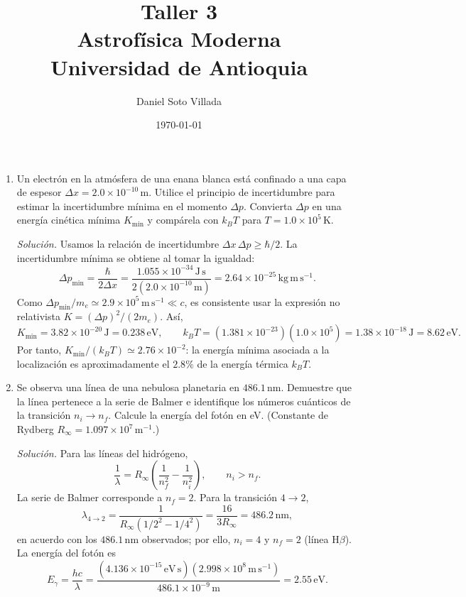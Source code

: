 \documentclass[11pt]{article}
\title{Taller 3\\[0.5em]
\large Astrofísica Moderna\\
Universidad de Antioquia}
\author{Daniel Soto Villada}
\date{\today}
\begin{document}
\maketitle

\begin{enumerate}
    \item Un electrón en la atmósfera de una enana blanca está confinado a una capa de espesor $\Delta x = 2.0 \times 10^{-10}\,\mathrm{m}$. Utilice el principio de incertidumbre para estimar la incertidumbre mínima en el momento $\Delta p$. Convierta $\Delta p$ en una energía cinética mínima $K_{\min}$ y compárela con $k_B T$ para $T = 1.0 \times 10^5\,\mathrm{K}$.

    \textit{Solución.} Usamos la relación de incertidumbre $\Delta x\,\Delta p\geq\hbar/2$. La incertidumbre mínima se obtiene al tomar la igualdad:
    \[
        \Delta p_{\min}=\frac{\hbar}{2\Delta x}
        =\frac{1.055\times10^{-34}\,\mathrm{J\,s}}
        {2(2.0\times10^{-10}\,\mathrm{m})}
        =2.64\times10^{-25}\,\mathrm{kg\,m\,s^{-1}}.
    \]
    Como $\Delta p_{\min}/m_e\simeq2.9\times10^5\,\mathrm{m\,s^{-1}}\ll c$, es consistente usar la expresión no relativista $K=(\Delta p)^2/(2m_e)$. Así,
    \[
        K_{\min}=3.82\times10^{-20}\,\mathrm{J}=0.238\,\mathrm{eV},
        \qquad k_BT=(1.381\times10^{-23})(1.0\times10^5)
        =1.38\times10^{-18}\,\mathrm{J}=8.62\,\mathrm{eV}.
    \]
    Por tanto, $K_{\min}/(k_BT)\simeq2.76\times10^{-2}$: la energía mínima asociada a la localización es aproximadamente el $2.8\%$ de la energía térmica $k_BT$. \parencite[Secs. 16.4, pp. 545--546; 18.5, p. 606]{chaparro2026}
    

    \item Se observa una línea de una nebulosa planetaria en $486.1\,\mathrm{nm}$. Demuestre que la línea pertenece a la serie de Balmer e identifique los números cuánticos de la transición $n_i \to n_f$. Calcule la energía del fotón en eV. (Constante de Rydberg $R_\infty = 1.097 \times 10^7\,\mathrm{m}^{-1}$.)

    \textit{Solución.} Para las líneas del hidrógeno,
    \[
        \frac{1}{\lambda}=R_\infty\left(\frac{1}{n_f^2}-\frac{1}{n_i^2}\right),
        \qquad n_i>n_f.
    \]
    La serie de Balmer corresponde a $n_f=2$. Para la transición $4\to2$,
    \[
        \lambda_{4\to2}=\frac{1}{R_\infty(1/2^2-1/4^2)}
        =\frac{16}{3R_\infty}=486.2\,\mathrm{nm},
    \]
    en acuerdo con los $486.1\,\mathrm{nm}$ observados; por ello, $n_i=4$ y $n_f=2$ (línea H$\beta$). La energía del fotón es
    \[
        E_\gamma=\frac{hc}{\lambda}
        =\frac{(4.136\times10^{-15}\,\mathrm{eV\,s})(2.998\times10^8\,\mathrm{m\,s^{-1}})}
        {486.1\times10^{-9}\,\mathrm{m}}
        =2.55\,\mathrm{eV}.
    \]
    \parencite[Secs. 15.5--15.6, pp. 496, 503]{chaparro2026}
    


\end{enumerate}
\end{document}

